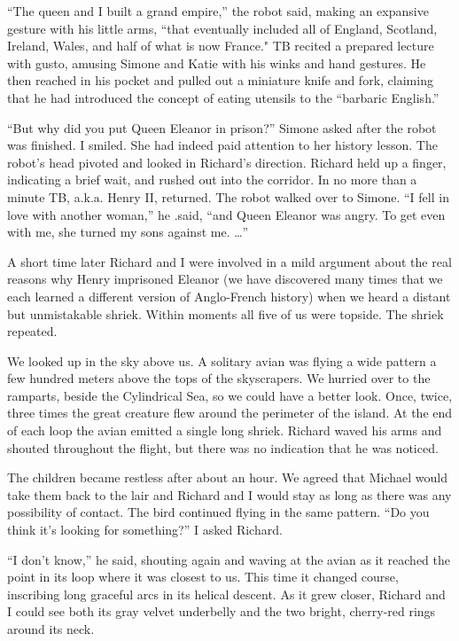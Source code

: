 \documentclass[]{article}
\begin{document}
“The queen and I built a grand empire,” the robot said, making an expansive gesture with his little arms, “that eventually included all of England, Scotland, Ireland, Wales, and half of what is now France."  TB recited a prepared lecture with gusto, amusing Simone and Katie with his winks and hand gestures.  He then reached in his pocket and pulled out a miniature knife and fork, claiming that he had introduced the concept of eating utensils to the “barbaric English.”

“But why did you put Queen Eleanor in prison?” Simone asked after the robot was finished.  I smiled.  She had indeed paid attention to her history lesson.  The robot’s head pivoted and looked in Richard’s direction.  Richard held up a finger, indicating a brief wait, and rushed out into the corridor.  In no more than a minute TB, a.k.a.  Henry II, returned.  The robot walked over to Simone.  “I fell in love with another woman,” he .said, “and Queen Eleanor was angry.  To get even with me, she turned my sons against me.  …”

A short time later Richard and I were involved in a mild argument about the real reasons why Henry imprisoned Eleanor (we have discovered many times that we each learned a different version of Anglo-French history) when we heard a distant but unmistakable shriek.  Within moments all five of us were topside.  The shriek repeated.

We looked up in the sky above us.  A solitary avian was flying a wide pattern a few hundred meters above the tops of the skyscrapers.  We hurried over to the ramparts, beside the Cylindrical Sea, so we could have a better look.  Once, twice, three times the great creature flew around the perimeter of the island.  At the end of each loop the avian emitted a single long shriek.  Richard waved his arms and shouted throughout the flight, but there was no indication that he was noticed.

The children became restless after about an hour.  We agreed that Michael would take them back to the lair and Richard and I would stay as long as there was any possibility of contact.  The bird continued flying in the same pattern.  “Do you think it’s looking for something?” I asked Richard.

“I don’t know,” he said, shouting again and waving at the avian as it reached the point in its loop where it was closest to us.  This time it changed course, inscribing long graceful arcs in its helical descent.  As it grew closer, Richard and I could see both its gray velvet underbelly and the two bright, cherry-red rings around its neck.
\end{document}
